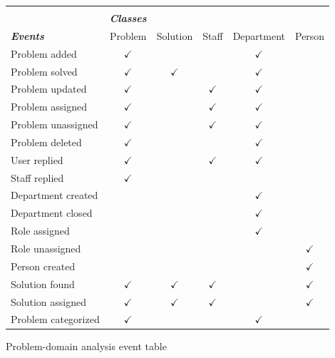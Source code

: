 \begin{figure}[ht]
\begin{tabular}{ l c c c c c} \hline
\\
&\emph{\textbf{Classes}} &  &  & &  \\ 
\emph{\textbf{Events}} & Problem & Solution & Staff & Department & Person \\ \hline
 Problem added 				& $ \checkmark $ &  &  & $ \checkmark $ &  \\ 
 Problem solved 			& $ \checkmark $ & $ \checkmark $ &  & $ \checkmark $ &  \\ 
 Problem updated 			& $ \checkmark $ &  & $ \checkmark $ & $ \checkmark $ &  \\ 
 Problem assigned 		& $ \checkmark $ &  & $ \checkmark $ & $ \checkmark $ &  \\ 
 Problem unassigned 	& $ \checkmark $ &  & $ \checkmark $ & $ \checkmark $ &  \\ 
 Problem deleted 			& $ \checkmark $ &  &  & $ \checkmark $ &  \\ 
 User replied 				& $ \checkmark $ &  & $ \checkmark $ & $ \checkmark $ &  \\ 
 Staff replied 				& $ \checkmark $ &  &  &  &  \\ 
 Department created 	&  &  &  & $ \checkmark $ &  \\ 
 Department closed 		&  &  &  & $ \checkmark $ &  \\ 
 Role assigned 				&  &  &  & $ \checkmark $ &  \\ 
 Role unassigned 			&  &  &  &  & $ \checkmark $ \\ 
 Person created 			&  &  &  &  & $ \checkmark $ \\ 
 Solution found 			& $ \checkmark $ & $ \checkmark $ & $ \checkmark $ &  & $ \checkmark $ \\ 
 Solution assigned			& $ \checkmark $ & $ \checkmark $ & $ \checkmark $ &  & $ \checkmark $ \\ 
 Problem categorized	& $ \checkmark $ &  &  & $ \checkmark $ &  \\ \hline
\end{tabular}
\caption{Problem-domain analysis event table}
\label{fig:classeseventstable}
\end{figure}